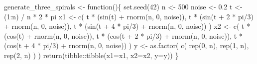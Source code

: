 \documentclass[
  letterpaper,
  DIV=11,
  numbers=noendperiod]{scrartcl}
\newenvironment{Shaded}{\begin{snugshade}}{\end{snugshade}}
\newcommand{\AttributeTok}[1]{\textcolor[rgb]{0.40,0.45,0.13}{#1}}
\newcommand{\ControlFlowTok}[1]{\textcolor[rgb]{0.00,0.23,0.31}{#1}}
\newcommand{\DecValTok}[1]{\textcolor[rgb]{0.68,0.00,0.00}{#1}}
\newcommand{\FloatTok}[1]{\textcolor[rgb]{0.68,0.00,0.00}{#1}}
\newcommand{\FunctionTok}[1]{\textcolor[rgb]{0.28,0.35,0.67}{#1}}
\newcommand{\NormalTok}[1]{\textcolor[rgb]{0.00,0.23,0.31}{#1}}
\newcommand{\OtherTok}[1]{\textcolor[rgb]{0.00,0.23,0.31}{#1}}
\newcommand{\SpecialCharTok}[1]{\textcolor[rgb]{0.37,0.37,0.37}{#1}}
\begin{document}
\begin{Shaded}
\begin{Highlighting}[]
\NormalTok{generate\_three\_spirals }\OtherTok{\textless{}{-}} \ControlFlowTok{function}\NormalTok{()\{}
  \FunctionTok{set.seed}\NormalTok{(}\DecValTok{42}\NormalTok{)}
\NormalTok{  n }\OtherTok{\textless{}{-}} \DecValTok{500}
\NormalTok{  noise }\OtherTok{\textless{}{-}} \FloatTok{0.2}
\NormalTok{  t }\OtherTok{\textless{}{-}}\NormalTok{ (}\DecValTok{1}\SpecialCharTok{:}\NormalTok{n) }\SpecialCharTok{/}\NormalTok{ n }\SpecialCharTok{*} \DecValTok{2} \SpecialCharTok{*}\NormalTok{ pi}
\NormalTok{  x1 }\OtherTok{\textless{}{-}} \FunctionTok{c}\NormalTok{(}
\NormalTok{      t }\SpecialCharTok{*}\NormalTok{ (}\FunctionTok{sin}\NormalTok{(t) }\SpecialCharTok{+} \FunctionTok{rnorm}\NormalTok{(n, }\DecValTok{0}\NormalTok{, noise)),}
\NormalTok{      t }\SpecialCharTok{*}\NormalTok{ (}\FunctionTok{sin}\NormalTok{(t }\SpecialCharTok{+} \DecValTok{2} \SpecialCharTok{*}\NormalTok{ pi}\SpecialCharTok{/}\DecValTok{3}\NormalTok{) }\SpecialCharTok{+} \FunctionTok{rnorm}\NormalTok{(n, }\DecValTok{0}\NormalTok{, noise)),}
\NormalTok{      t }\SpecialCharTok{*}\NormalTok{ (}\FunctionTok{sin}\NormalTok{(t }\SpecialCharTok{+} \DecValTok{4} \SpecialCharTok{*}\NormalTok{ pi}\SpecialCharTok{/}\DecValTok{3}\NormalTok{) }\SpecialCharTok{+} \FunctionTok{rnorm}\NormalTok{(n, }\DecValTok{0}\NormalTok{, noise))}
\NormalTok{    )}
\NormalTok{  x2 }\OtherTok{\textless{}{-}} \FunctionTok{c}\NormalTok{(}
\NormalTok{      t }\SpecialCharTok{*}\NormalTok{ (}\FunctionTok{cos}\NormalTok{(t) }\SpecialCharTok{+} \FunctionTok{rnorm}\NormalTok{(n, }\DecValTok{0}\NormalTok{, noise)),}
\NormalTok{      t }\SpecialCharTok{*}\NormalTok{ (}\FunctionTok{cos}\NormalTok{(t }\SpecialCharTok{+} \DecValTok{2} \SpecialCharTok{*}\NormalTok{ pi}\SpecialCharTok{/}\DecValTok{3}\NormalTok{) }\SpecialCharTok{+} \FunctionTok{rnorm}\NormalTok{(n, }\DecValTok{0}\NormalTok{, noise)),}
\NormalTok{      t }\SpecialCharTok{*}\NormalTok{ (}\FunctionTok{cos}\NormalTok{(t }\SpecialCharTok{+} \DecValTok{4} \SpecialCharTok{*}\NormalTok{ pi}\SpecialCharTok{/}\DecValTok{3}\NormalTok{) }\SpecialCharTok{+} \FunctionTok{rnorm}\NormalTok{(n, }\DecValTok{0}\NormalTok{, noise))}
\NormalTok{    )}
\NormalTok{  y }\OtherTok{\textless{}{-}} \FunctionTok{as.factor}\NormalTok{(}
    \FunctionTok{c}\NormalTok{(}
      \FunctionTok{rep}\NormalTok{(}\DecValTok{0}\NormalTok{, n), }
      \FunctionTok{rep}\NormalTok{(}\DecValTok{1}\NormalTok{, n), }
      \FunctionTok{rep}\NormalTok{(}\DecValTok{2}\NormalTok{, n)}
\NormalTok{    )}
\NormalTok{  )}
  \FunctionTok{return}\NormalTok{(tibble}\SpecialCharTok{::}\FunctionTok{tibble}\NormalTok{(}\AttributeTok{x1=}\NormalTok{x1, }\AttributeTok{x2=}\NormalTok{x2, }\AttributeTok{y=}\NormalTok{y))}
\NormalTok{\}}
\end{Highlighting}
\end{Shaded}
\end{document}

